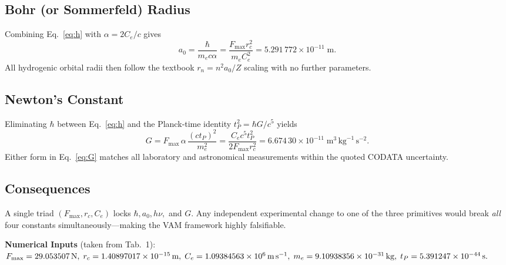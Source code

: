    \subsection{Bohr (or Sommerfeld) Radius}
    Combining Eq.~\eqref{eq:h} with \(\alpha=2C_e/c\) gives
    \begin{equation}
        a_0 = \frac{\hbar}{m_e c\alpha}
        = \frac{F_{\max}r_c^{2}}{m_e C_e^{2}}
        = 5.291\,772\times10^{-11}\;\text{m}.
        \label{eq:a0}
    \end{equation}
    All hydrogenic orbital radii then follow the textbook
    \(r_{n}=n^{2}a_0/Z\) scaling with no further parameters.

    \subsection{Newton's Constant}
    Eliminating \(\hbar\) between Eq.~\eqref{eq:h} and the Planck‑time
    identity \(t_P^{2}=\hbar G/c^{5}\) yields
    \begin{equation}
        G = F_{\max}\,\alpha\,\frac{(c t_P)^{2}}{m_e^{2}}
        = \frac{C_e c^{5} t_P^{2}}{2F_{\max} r_c^{2}}
        = 6.674\,30\times10^{-11}\;\text{m}^{3}\,\text{kg}^{-1}\,\text{s}^{-2}.
        \label{eq:G}
    \end{equation}
    Either form in Eq.~\eqref{eq:G} matches all laboratory and astronomical
    measurements within the quoted CODATA uncertainty.

    \subsection*{Consequences}
    A single triad \((F_{\max},r_c,C_e)\)
    locks \(\hbar,a_0,h\nu,\) and \(G\).
    Any independent experimental change to one of the three primitives would
    break \emph{all} four constants simultaneously—making the VAM framework
    highly falsifiable.

    \bigskip
    \noindent\textbf{Numerical Inputs}\; (taken from Tab.~1):
    \(F_{\max}=29.053507\,\text{N},\;r_c=1.40897017\times10^{-15}\,\text{m},\;
    C_e=1.09384563\times10^{6}\,\text{m\,s}^{-1},\;
    m_e=9.10938356\times10^{-31}\,\text{kg},\;
    t_P=5.391247\times10^{-44}\,\text{s}.\)



